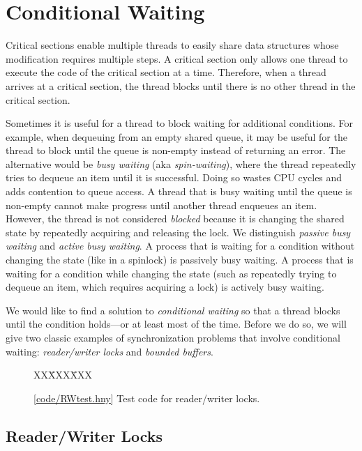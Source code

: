 \documentclass{report}
\newcommand{\harmonysource}[1]{
\begin{tabbing}
XX\=XXX\=XXX\kill
    
\end{tabbing}
}
\newcommand{\harmonylink}[1]{%
[\href{https://harmony.cs.cornell.edu/#1}{\underline{#1}}]%
}
\newenvironment{code}{
\tcolorbox
}{
\endtcolorbox
}
\begin{document}
\chapter{Conditional Waiting}
\label{ch:condwait}

Critical sections enable multiple threads
to easily share data structures whose modification
requires multiple steps.
A critical section only allows one thread to execute the code
of the critical section at a time.
Therefore, when a thread arrives at a critical section,
the thread blocks until there is no other thread in the critical section.

%
%
Sometimes it is useful for a thread to block waiting for additional
conditions.
For example, when dequeuing from an empty shared queue,
it may be useful for the thread to block until the queue is non-empty
instead of returning an error.
The alternative would be \emph{busy waiting} (aka \emph{spin-waiting}),
where the thread repeatedly tries to dequeue an item until it is successful.
Doing so wastes CPU cycles and adds contention to queue access.
%
A thread that is busy waiting until the queue is non-empty cannot
make progress until another thread enqueues an item.
However, the thread is not considered \emph{blocked} because it is
changing the shared state by repeatedly acquiring and releasing the
lock.
We distinguish \emph{passive busy waiting} and \emph{active busy waiting}.
A process that is waiting for a condition without changing the state
(like in a spinlock) is passively busy waiting.
A process that is waiting for a condition while changing the state
(such as repeatedly trying to dequeue an item, which requires
acquiring a lock) is actively busy waiting.

We would like to find a solution to \emph{conditional waiting}
so that a thread blocks until the condition holds---or at least most
of the time.
Before we do so, we will give two classic examples of synchronization
problems that involve conditional waiting: \emph{reader/writer locks}
and \emph{bounded buffers}.

\begin{figure}
\begin{code}
\harmonysource{RWtest}
\end{code}
\caption{\harmonylink{code/RWtest.hny} Test code for reader/writer locks.}
\label{fig:rwtest}
\end{figure}

\section{Reader/Writer Locks}
%
%
\end{document}
